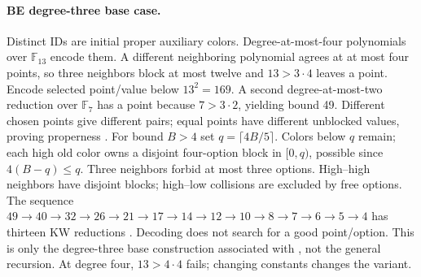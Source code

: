\documentclass[10pt]{article}
\begin{document}
\paragraph{BE degree-three base case.}
Distinct IDs are initial proper auxiliary colors. Degree-at-most-four
polynomials over $\mathbb F_{13}$ encode them. A different neighboring
polynomial agrees at at most four points, so three neighbors block at most
twelve and $13>3\cdot4$ leaves a point. Encode selected point/value below
$13^2=169$. A second degree-at-most-two reduction over $\mathbb F_7$ has
a point because $7>3\cdot2$, yielding bound 49. Different chosen points
give different pairs; equal points have different unblocked values, proving
properness \citep{linial1992locality}.
For bound $B>4$ set $q=\lceil4B/5\rceil$. Colors below $q$ remain; each
high old color owns a disjoint four-option block in $[0,q)$, possible since
$4(B-q)\le q$. Three neighbors forbid at most three options. High--high
neighbors have disjoint blocks; high--low collisions are excluded by free
options. The sequence
$49\to40\to32\to26\to21\to17\to14\to12\to10\to8\to7\to6\to5\to4$
has thirteen KW reductions \citep{kuhn2006complexity}. Decoding does not search
for a good point/option. This is only the degree-three base construction
associated with \citet{barenboim2008linear}, not the general recursion.
At degree four, $13>4\cdot4$ fails; changing constants changes the variant.
\end{document}
